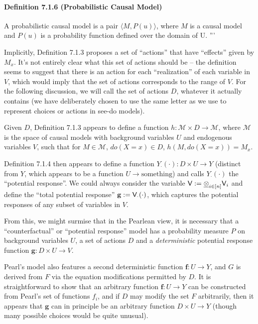 \paragraph{Definition 7.1.6 (Probabilistic Causal Model)}
A probabilistic causal model is a pair $\langle M, P(u)\rangle$, where $M$ is a causal model and $P(u)$ is a probability function defined over the domain of U.
'''


\vspace{1cm}

Implicitly, Definition 7.1.3 proposes a set of ``actions'' that have ``effects'' given by $M_x$. It's not entirely clear what this set of actions should be -- the definition seems to suggest that there is an action for each ``realization'' of each variable in $V$, which would imply that the set of actions corresponds to the range of $V$. For the following discussion, we will call the set of actions $D$, whatever it actually contains (we have deliberately chosen to use the same letter as we use to represent choices or actions in see-do models).

Given $D$, Definition 7.1.3 appears to define a function $h:\mathscr{M}\times D\to \mathscr{M}$, where $\mathscr{M}$ is the space of causal models with background variables $U$ and endogenous variables $V$, such that for $M\in \mathscr{M}$, $do(X=x)\in D$, $h(M,do(X=x))=M_x$.

Definition 7.1.4 then appears to define a function $Y_\cdot(\cdot):D\times U\to Y$ (distinct from $Y$, which appears to be a function $U\to\text{something}$) and calls $Y_\cdot(\cdot)$ the ``potential response''. We could always consider the variable $\mathsf{V}:=\underline{\otimes}_{i\in [n]} \mathsf{V}_i$ and define the ``total potential response'' $\mathbf{g}:=\mathsf{V}_\cdot(\cdot)$, which captures the potential responses of any subset of variables in $V$.

From this, we might surmise that in the Pearlean view, it is necessary that a ``counterfactual'' or ``potential response'' model has a probability measure $P$ on background variables $U$, a set of actions $D$ and a \emph{deterministic} potential response function $\mathbf{g}:D\times U\to V$.

Pearl's model also features a second deterministic function $\mathbf{f}:U\to Y$, and $G$ is derived from $F$ via the equation modifications permitted by $D$. It is straightforward to show that an arbitrary function $\mathbf{f}:U\to Y$ can be constructed from Pearl's set of functions $f_i$, and if $D$ may modify the set $F$ arbitrarily, then it appears that $\mathbf{g}$ can in principle be an arbitrary function $D\times U\to Y$ (though many possible choices would be quite unusual).

